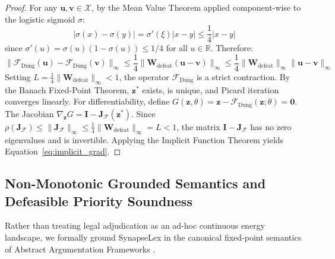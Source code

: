 \documentclass[11pt,a4paper]{article}
\begin{document}
\begin{proof}
For any $\mathbf{u}, \mathbf{v} \in \mathcal{X}$, by the Mean Value Theorem applied component-wise to the logistic sigmoid $\sigma$:
\begin{equation}
|\sigma(x) - \sigma(y)| = \sigma'(\xi) |x - y| \le \frac{1}{4} |x - y|
\end{equation}
since $\sigma'(u) = \sigma(u)(1 - \sigma(u)) \le 1/4$ for all $u \in \mathbb{R}$. Therefore:
\begin{equation}
\|\mathcal{F}_{\text{Dung}}(\mathbf{u}) - \mathcal{F}_{\text{Dung}}(\mathbf{v})\|_\infty \le \frac{1}{4} \|\mathbf{W}_{\text{defeat}}(\mathbf{u} - \mathbf{v})\|_\infty \le \frac{1}{4} \|\mathbf{W}_{\text{defeat}}\|_\infty \|\mathbf{u} - \mathbf{v}\|_\infty
\end{equation}
Setting $L = \frac{1}{4} \|\mathbf{W}_{\text{defeat}}\|_\infty < 1$, the operator $\mathcal{F}_{\text{Dung}}$ is a strict contraction. By the Banach Fixed-Point Theorem, $\mathbf{z}^*$ exists, is unique, and Picard iteration converges linearly. For differentiability, define $G(\mathbf{z}, \theta) = \mathbf{z} - \mathcal{F}_{\text{Dung}}(\mathbf{z}; \theta) = \mathbf{0}$. The Jacobian $\nabla_{\mathbf{z}} G = \mathbf{I} - \mathbf{J}_{\mathcal{F}}(\mathbf{z}^*)$. Since $\rho(\mathbf{J}_{\mathcal{F}}) \le \|\mathbf{J}_{\mathcal{F}}\|_\infty \le \frac{1}{4} \|\mathbf{W}_{\text{defeat}}\|_\infty = L < 1$, the matrix $\mathbf{I} - \mathbf{J}_{\mathcal{F}}$ has no zero eigenvalues and is invertible. Applying the Implicit Function Theorem yields Equation~\ref{eq:implicit_grad}.
\end{proof}

\subsection{Non-Monotonic Grounded Semantics and Defeasible Priority Soundness}
\label{sec:grounded_semantics}
Rather than treating legal adjudication as an ad-hoc continuous energy landscape, we formally ground SynapseLex in the canonical fixed-point semantics of Abstract Argumentation Frameworks \citep{dung1995acceptability, prakken2015formal}.
\end{document}
